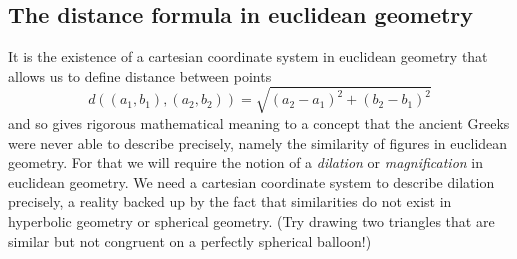 \documentclass[newpage,hints,handout,noauthor,nooutcomes,12pt]{ximera}
\begin{document}



\subsection{The distance formula in euclidean geometry}

It is the existence of a cartesian coordinate system in euclidean geometry that
allows us to define distance between points%
\[
d\left( (a_{1},b_{1}), (a_{2},b_{2}) \right)
=\sqrt{(a_{2}-a_{1})^{2}+(b_{2}-b_{1})^{2}}
\]
and so gives rigorous mathematical meaning to a concept that the
ancient Greeks were never able to describe precisely, namely the
similarity of figures in euclidean geometry. For that we will require the
notion of a \textit{dilation} or \textit{magnification} in
euclidean geometry. We need a cartesian coordinate system to describe
dilation precisely, a reality backed up by the fact that similarities
do not exist in hyperbolic geometry or spherical geometry. (Try drawing two triangles
that are similar but not congruent on a perfectly spherical balloon!)
\end{document}
